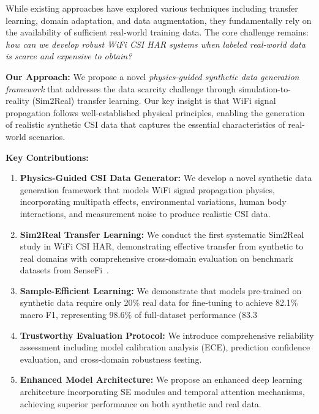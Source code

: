 \documentclass[journal]{IEEEtran}
\begin{document}
While existing approaches have explored various techniques including transfer learning, domain adaptation, and data augmentation, they fundamentally rely on the availability of sufficient real-world training data. The core challenge remains: \textit{how can we develop robust WiFi CSI HAR systems when labeled real-world data is scarce and expensive to obtain?}

\textbf{Our Approach:} We propose a novel \textit{physics-guided synthetic data generation framework} that addresses the data scarcity challenge through simulation-to-reality (Sim2Real) transfer learning. Our key insight is that WiFi signal propagation follows well-established physical principles, enabling the generation of realistic synthetic CSI data that captures the essential characteristics of real-world scenarios.

\textbf{Key Contributions:}
\begin{enumerate}
\item \textbf{Physics-Guided CSI Data Generator:} We develop a novel synthetic data generation framework that models WiFi signal propagation physics, incorporating multipath effects, environmental variations, human body interactions, and measurement noise to produce realistic CSI data.

\item \textbf{Sim2Real Transfer Learning:} We conduct the first systematic Sim2Real study in WiFi CSI HAR, demonstrating effective transfer from synthetic to real domains with comprehensive cross-domain evaluation on benchmark datasets from SenseFi~\cite{yang2023sensefi}.

\item \textbf{Sample-Efficient Learning:} We demonstrate that models pre-trained on synthetic data require only 20\% real data for fine-tuning to achieve 82.1\% macro F1, representing 98.6\% of full-dataset performance (83.3%

\item \textbf{Trustworthy Evaluation Protocol:} We introduce comprehensive reliability assessment including model calibration analysis (ECE), prediction confidence evaluation, and cross-domain robustness testing.

\item \textbf{Enhanced Model Architecture:} We propose an enhanced deep learning architecture incorporating SE modules and temporal attention mechanisms, achieving superior performance on both synthetic and real data.
\end{enumerate}
\end{document}
